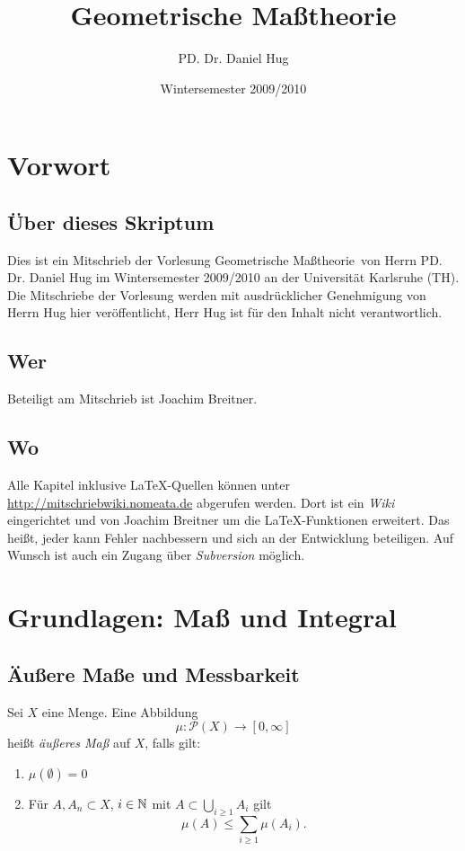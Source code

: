 \documentclass[a4paper,twoside,DIV15,BCOR12mm]{scrbook}
\author{PD. Dr. Daniel Hug}
\title{Geometrische Maßtheorie}
\date{Wintersemester 2009/2010}
\begin{document}
\maketitle

\tableofcontents

\chapter*{Vorwort}

\section*{Über dieses Skriptum}
Dies ist ein Mitschrieb der Vorlesung \glqq Geometrische Maßtheorie\grqq\
von Herrn PD. Dr. Daniel Hug im Wintersemester 2009/2010 an der Universität Karlsruhe (TH).
 Die Mitschriebe der Vorlesung werden mit ausdrücklicher Genehmigung von Herrn Hug hier veröffentlicht,
Herr Hug ist für den Inhalt nicht verantwortlich.

\section*{Wer}
Beteiligt am Mitschrieb ist Joachim Breitner.

\section*{Wo}
Alle Kapitel inklusive \LaTeX-Quellen können unter \url{http://mitschriebwiki.nomeata.de} abgerufen werden.
Dort ist ein \emph{Wiki} eingerichtet und von Joachim Breitner um die \LaTeX-Funktionen erweitert.
Das heißt, jeder kann Fehler nachbessern und sich an der Entwicklung
beteiligen. Auf Wunsch ist auch ein Zugang über \emph{Subversion} möglich.

\chapter{Grundlagen: Maß und Integral}

\section{Äußere Maße und Messbarkeit}

\begin{definition}
Sei $X$ eine Menge. Eine Abbildung
\[
\mu : \mathcal P(X) \to [0,\infty]
\]
heißt \emph{äußeres Maß} auf $X$, falls gilt:
\begin{enumerate}
\item $\mu(\emptyset) = 0$
\item Für $A,A_n \subset X$, $i\in \mathbb{N}$ mit $A\subset \bigcup_{i\ge 1} A_i$ gilt 
\[
\mu(A) \le \sum_{i\ge1} \mu(A_i).
\]
\end{enumerate}
\end{definition}
\end{document}
